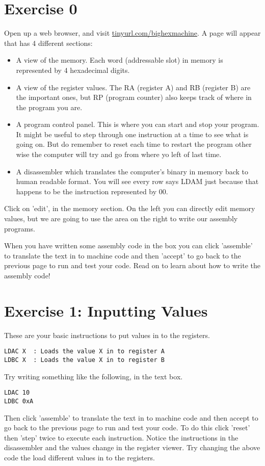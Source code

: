 \documentclass[10pt,a4paper]{article}
\begin{document}
\section{Exercise 0}
Open up a web browser, and visit \href{http://tinyurl.com/bighexmachine}{tinyurl.com/bighexmachine}. A page will appear  that has 4 different sections:
\begin{itemize}
\item A view of the memory. Each word (addressable slot) in memory is represented by  4 hexadecimal digits.
\item A view of the register values. The RA (register A) and RB (register B) are the important ones, but RP (program counter) also keeps track of where in the program you are.
\item A program control panel. This is where you can start and stop your program. It might be useful to step through one instruction at a time to see what is going on. But do remember to reset each time to restart the program other wise the computer will try and go from where yo left of last time.
\item A disassembler which translates the computer's binary in memory back to human readable format. You will see every row says LDAM just because that happens to be the instruction represented by 00. 
\end{itemize}

Click on 'edit', in the memory section.
On the left you can directly edit memory values, but we are going to use the area on the right to write our assembly programs.

When you have written some assembly code in the box you can click 'assemble' to translate the text in to machine code and then 'accept' to go back to the previous page to run and test your code. Read on to learn about how to write the assembly code!

\section{Exercise 1: Inputting Values}
These are your basic instructions to put values in to the registers.
\begin{verbatim}
LDAC X	: Loads the value X in to register A
LDBC X	: Loads the value X in to register B
\end{verbatim}

Try writing something like the following, in the text box.
\begin{lstlisting}[frame=single]
LDAC 10
LDBC 0xA
\end{lstlisting}
Then click 'assemble' to translate the text in to machine code and then accept to go back to the previous page to run and test your code. To do this click 'reset' then 'step' twice to execute each instruction. Notice the instructions in the disassembler and the values change in the register viewer. Try changing the above code the load different values in to the registers.
\end{document}
